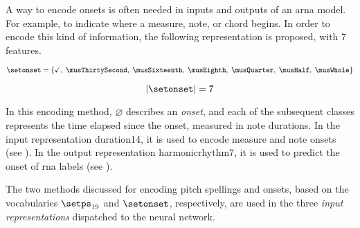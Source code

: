 
A way to encode onsets is often needed in inputs and outputs
of an \gls{arna} model. For example, to indicate where a
measure, note, or chord begins. 
In order to encode this kind of information, the following
representation is proposed, with 7 features.

\begin{equation}
    \label{eq:onset_7}
    \setonset = \{\checkmark,\; \musThirtySecond,\; \musSixteenth,\; 
    \musEighth,\; \musQuarter,\; \musHalf,\; \musWhole \}
\end{equation}

\begin{equation}
    \label{eq:onset_7_magnitude}
    | \setonset | = 7
\end{equation}

In this encoding method, $\varnothing$ describes an
\emph{onset}, and each of the subsequent classes represents
the time elapsed since the onset, measured in note
durations. In the input representation \gls{duration14}, it
is used to encode measure and note onsets (see
). In the output
representation \gls{harmonicrhythm7}, it is used to predict
the onset of \gls{rna} labels (see
).

The two methods discussed for encoding pitch spellings and
onsets, based on the vocabularies $\setps_{19}$ and
$\setonset$, respectively, are used in the three \emph{input
representations} dispatched to the neural network.
